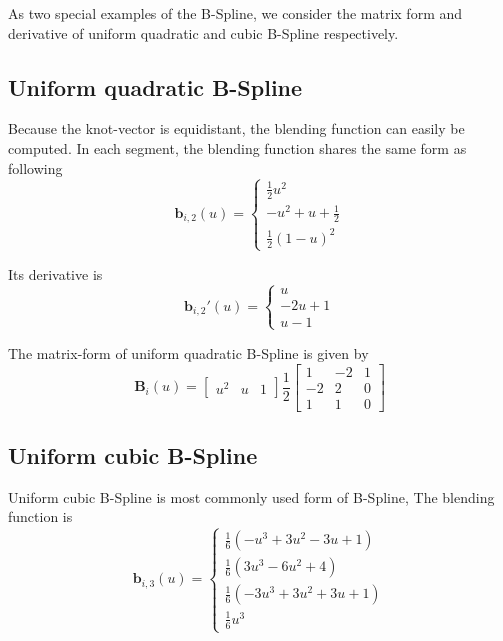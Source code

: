 As two special examples of the B-Spline, we consider the matrix form and
derivative of uniform quadratic and cubic B-Spline respectively.

\subsection{Uniform quadratic B-Spline}
\label{sec:uqb}

Because the knot-vector is equidistant, the blending function can
easily be computed. In each segment, the blending function shares the
same form as following
\begin{equation}
  \label{eq:4.3}
  \mathbf{b}_{i,2}(u) = \begin{cases} \frac{1}{2}u^2 \\ -u^2 + u + \frac{1}{2} \\ \frac{1}{2}(1-u)^2   \end{cases}
\end{equation}

Its derivative is 
\begin{equation}
  \label{eq:4.4}
  \mathbf{b}_{i,2}'(u) = \begin{cases} u \\ -2u + 1 \\ u-1   \end{cases}
\end{equation}

The matrix-form of uniform quadratic B-Spline is given by
\begin{equation}
  \label{eq:4.5}
\mathbf{B}_i(u) = \begin{bmatrix} u^2 & u & 1 \end{bmatrix} \frac{1}{2} \begin{bmatrix}
1 & -2 & 1 \\
-2 &  2 & 0 \\
1 &  1 & 0 \end{bmatrix}
\end{equation}

\subsection{Uniform cubic B-Spline}
\label{sec:uqb}
Uniform cubic B-Spline is most commonly used form of B-Spline, 
The blending function is
\begin{equation}
  \label{eq:4.6}
  \mathbf{b}_{i,3}(u) = \begin{cases} \frac{1}{6}(-u^3+3u^2-3u+1) \\
    \frac{1}{6}(3u^3 -6u^2+4)\\ \frac{1}{6}(-3u^3+3u^2+3u+1) \\
    \frac{1}{6}u^3
   \end{cases}
\end{equation}

